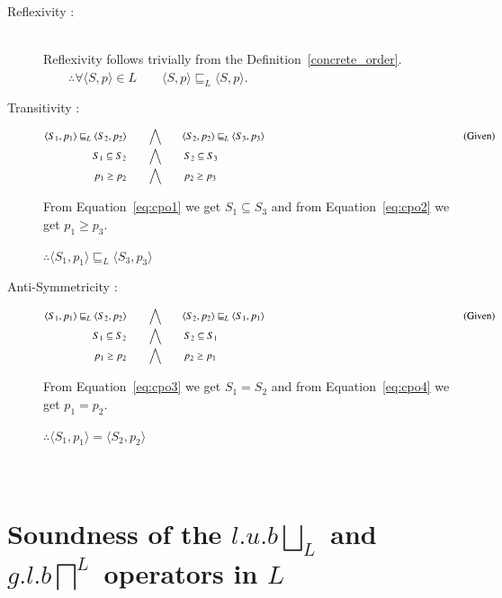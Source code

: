 \documentclass[final,3p, review, times]{Elsevier/elsarticle}
\begin{document}
\begin{description}
\item[Reflexivity :] \hfill \\
	Reflexivity follows trivially from the Definition~\ref{concrete_order}. $\qquad\therefore\forall \langle S,p\rangle\in L\qquad\langle S,p\rangle\sqsubseteq_L\langle S,p\rangle$.
\item[Transitivity :] \hfill
\begin{alignat}{2}
    \langle S_1,p_1\rangle\sqsubseteq_L\langle S_2,p_2\rangle &\qquad\bigwedge\qquad \langle S_2,p_2\rangle\sqsubseteq_L\langle S_3,p_3\rangle\hspace{68mm}\text{(Given)}\nonumber\\
    S_1\subseteq S_2 &\qquad\bigwedge\qquad S_2\subseteq S_3\label{eq:cpo1}\\
    p_1\geq p_2 &\qquad\bigwedge\qquad p_2\geq p_3\label{eq:cpo2}
\end{alignat}

From Equation~\ref{eq:cpo1} we get $S_1\subseteq S_3$ and from Equation~\ref{eq:cpo2} we get
$p_1\geq p_3$.
	
	$\therefore \langle S_1,p_1\rangle\sqsubseteq_L\langle S_3,p_3\rangle$
\item[Anti-Symmetricity :] \hfill
\begin{alignat}{2}
    \langle S_1,p_1\rangle\sqsubseteq_L\langle S_2,p_2\rangle &\qquad\bigwedge\qquad \langle S_2,p_2\rangle\sqsubseteq_L\langle S_1,p_1\rangle\hspace{68mm}\text{(Given)}\nonumber\\
    S_1\subseteq S_2 &\qquad\bigwedge\qquad S_2\subseteq S_1\label{eq:cpo3}\\
    p_1\geq p_2 &\qquad\bigwedge\qquad p_2\geq p_1\label{eq:cpo4}
\end{alignat}

From Equation~\ref{eq:cpo3} we get $S_1=S_2$ and from Equation~\ref{eq:cpo4} we get $p_1=p_2$.
	
	$\therefore \langle S_1,p_1\rangle=\langle S_2,p_2\rangle$
\end{description}









\section{\\Soundness of the $l.u.b \displaystyle\bigsqcup_L$ and $g.l.b \displaystyle\bigsqcap^L$ operators in $L$}
\label{app:concrete_ub}
\end{document}
